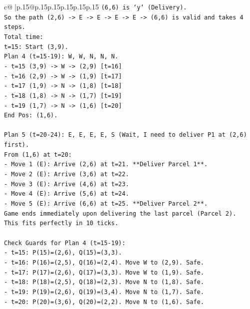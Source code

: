 \documentclass{article}
\begin{document}
{\begin{supertabular}{c@{$\;$}|p{.15\linewidth}@{}p{.15\linewidth}p{.15\linewidth}p{.15\linewidth}p{.15\linewidth}p{.15\linewidth}}
{{{\texttt{(6,6) is `y` (Delivery).} \\
\texttt{So the path (2,6) {-}> E {-}> E {-}> E {-}> E {-}> (6,6) is valid and takes 4 steps.} \\
\texttt{Total time:} \\
\texttt{t=15: Start (3,9).} \\
\texttt{Plan 4 (t=15{-}19): W, W, N, N, N.} \\
\texttt{{-} t=15 (3,9) {-}> W {-}> (2,9) {[}t=16{]}} \\
\texttt{{-} t=16 (2,9) {-}> W {-}> (1,9) {[}t=17{]}} \\
\texttt{{-} t=17 (1,9) {-}> N {-}> (1,8) {[}t=18{]}} \\
\texttt{{-} t=18 (1,8) {-}> N {-}> (1,7) {[}t=19{]}} \\
\texttt{{-} t=19 (1,7) {-}> N {-}> (1,6) {[}t=20{]}} \\
\texttt{End Pos: (1,6).} \\
\\ 
\texttt{Plan 5 (t=20{-}24): E, E, E, E, S (Wait, I need to deliver P1 at (2,6) first).} \\
\texttt{From (1,6) at t=20:} \\
\texttt{{-} Move 1 (E): Arrive (2,6) at t=21. **Deliver Parcel 1**.} \\
\texttt{{-} Move 2 (E): Arrive (3,6) at t=22.} \\
\texttt{{-} Move 3 (E): Arrive (4,6) at t=23.} \\
\texttt{{-} Move 4 (E): Arrive (5,6) at t=24.} \\
\texttt{{-} Move 5 (E): Arrive (6,6) at t=25. **Deliver Parcel 2**.} \\
\texttt{Game ends immediately upon delivering the last parcel (Parcel 2).} \\
\texttt{This fits perfectly in 10 ticks.} \\
\\ 
\texttt{Check Guards for Plan 4 (t=15{-}19):} \\
\texttt{{-} t=15: P(15)=(2,6), Q(15)=(3,3).} \\
\texttt{{-} t=16: P(16)=(2,5), Q(16)=(2,4). Move W to (2,9). Safe.} \\
\texttt{{-} t=17: P(17)=(2,6), Q(17)=(3,3). Move W to (1,9). Safe.} \\
\texttt{{-} t=18: P(18)=(2,5), Q(18)=(2,3). Move N to (1,8). Safe.} \\
\texttt{{-} t=19: P(19)=(2,6), Q(19)=(3,4). Move N to (1,7). Safe.} \\
\texttt{{-} t=20: P(20)=(3,6), Q(20)=(2,2). Move N to (1,6). Safe.} \\
}}}
\end{supertabular}}
\end{document}
